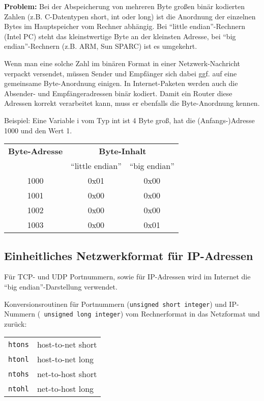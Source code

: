 \documentclass[12pt,utf8]{article}
\begin{document}
{\bf Problem:} Bei der Abspeicherung von mehreren Byte großen binär kodierten
Zahlen (z.B. C-Datentypen short, int oder long) ist die Anordnung der einzelnen Bytes
im Hauptspeicher vom Rechner abhängig. Bei ``little endian''-Rechnern (Intel PC) steht das
kleinstwertige Byte an der kleinsten Adresse, bei ``big endian''-Rechnern
(z.B. ARM, Sun SPARC) ist es umgekehrt. 

Wenn man eine solche Zahl im binären Format in einer Netzwerk-Nachricht
verpackt versendet, müssen Sender und Empfänger sich dabei ggf. auf eine
gemeinsame Byte-Anordnung einigen. In Internet-Paketen werden auch die
Absender- und Empfängeradressen binär kodiert. Damit ein Router diese Adressen
korrekt verarbeitet kann, muss er ebenfalls die Byte-Anordnung kennen.

Beispiel: Eine Variable i vom Typ
int ist 4 Byte groß, hat die (Anfangs-)Adresse 1000 und den Wert 1.

\begin{center} 
\begin{tabular}{c|c|c}
{\bf Byte-Adresse} & \multicolumn{2}{c}{{\bf Byte-Inhalt}}\\
           & ``little endian'' &  ``big endian''\\ \hline
1000 & 0x01 & 0x00\\ \hline
1001 & 0x00 & 0x00\\ \hline
1002 & 0x00 & 0x00\\ \hline
1003 & 0x00 & 0x01\\ \hline
\end{tabular}
\end{center}

\subsection*{Einheitliches Netzwerkformat für IP-Adressen}

Für TCP- und UDP Portnummern, sowie für IP-Adressen wird im Internet die
``big endian''-Darstellung verwendet.

Konversionsroutinen für Portnummern ({\tt unsigned short integer}) und IP-Nummern ({\tt
unsigned long integer}) vom Rechnerformat in das Netzformat und zurück:

\begin{center}
\begin{tabular}{ll}
{\tt htons} & host-to-net short\\
{\tt htonl} & host-to-net long\\
{\tt ntohs} & net-to-host short\\
{\tt ntohl} & net-to-host long\\
\end{tabular}
\end{center}
\end{document}
